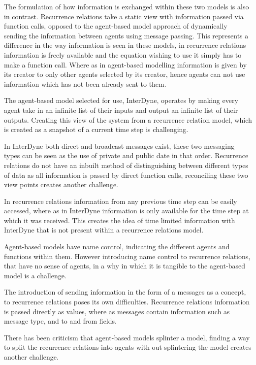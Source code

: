 \documentclass{article}
\begin{document}
The formulation of how information is exchanged within these two models is also in contrast. Recurrence relations take a static view with information passed via function calls, opposed to the agent-based model approach of dynamically sending the information between agents using message passing. This represents a difference in the way information is seen in these models, in recurrence relations information is freely available and the equation wishing to use it simply has to make a function call. Where as in agent-based modelling information is given by its creator to only other agents selected by its creator, hence agents can not use information which has not been already sent to them.

The agent-based model selected for use, InterDyne, operates by making every agent take in an infinite list of their inputs and output an infinite list of their outputs. Creating this view of the system from a recurrence relation model, which is created as a snapshot of a current time step is challenging. 

In InterDyne both direct and broadcast messages exist, these two messaging types can be seen as the use of private and public date in that order. Recurrence relations do not have an inbuilt method of distinguishing between different types of data as all information is passed by direct function calls, reconciling these two view points creates another challenge. 

In recurrence relations information from any previous time step can be easily accessed, where as in InterDyne information is only available for the time step at which it was received. This creates the idea of time limited information with InterDyne that is not present within a recurrence relations model.   

Agent-based models have name control, indicating the different agents and functions within them. However introducing name control to  recurrence relations, that have no sense of agents, in a why in which it is tangible to the agent-based model is a challenge. 

The introduction of sending information in the form of a messages as a concept, to recurrence relations poses its own difficulties. Recurrence relations information is passed directly as values, where as messages contain information such as message type, and to and from fields. 

There has been criticism that agent-based models splinter a model, finding a way to split the recurrence relations into agents with out splintering the model creates another challenge. 
\end{document}
